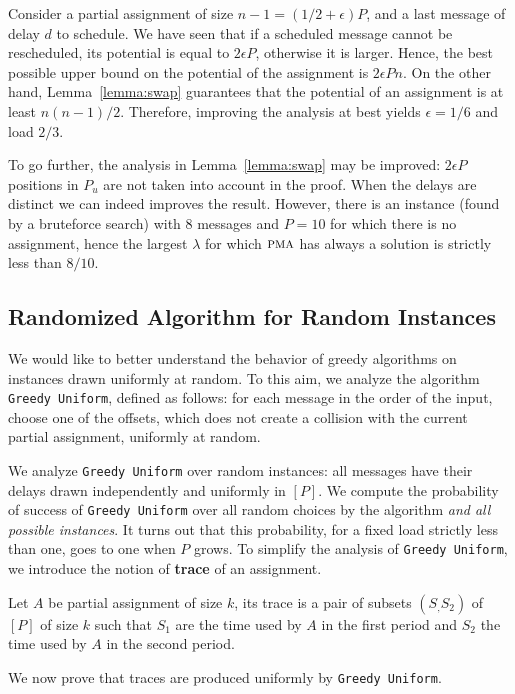 \documentclass[a4paper,UKenglish,cleveref, autoref, thm-restate]{lipics-v2019}
\newcommand\pma{\textsc{pma}\xspace}
\newcommand\greedyuniform{\texttt{Greedy Uniform}\xspace}
\begin{document}
Consider a partial assignment of size $n-1 = (1/2 + \epsilon)P$, and a last message of delay $d$ to schedule.
We have seen that if a scheduled message cannot be rescheduled, its potential is equal to $2\epsilon P$, otherwise it is larger.
Hence, the best possible upper bound on the potential of the assignment is $2\epsilon P n$. On the other hand, Lemma~\ref{lemma:swap} guarantees
that the potential of an assignment is at least $n(n-1)/2$. Therefore, improving the analysis at best yields $\epsilon = 1/6$ and 
load $2/3$.

To go further, the analysis in Lemma~\ref{lemma:swap} may be improved: $2\epsilon P$ positions in $P_{u}$ are not taken into account in the proof. When the delays are distinct we can indeed improves the result. However, there is an instance (found by a bruteforce search) with $8$ messages and $P=10$ for which there is no assignment, hence the largest $\lambda$ for which $\pma$ has always a solution is strictly less than $8/10$. 

\subsection{Randomized Algorithm for Random Instances}

We would like to better understand the behavior of greedy algorithms on instances drawn uniformly at random. To this aim, we analyze the algorithm \greedyuniform, defined as follows: for each message in the order of the input, choose one of the offsets, which does not create a collision with the current partial assignment, uniformly at random. 

We analyze \greedyuniform over random instances:  all messages have 
their delays drawn independently and uniformly in $[P]$. We compute the probability of success of \greedyuniform over all random choices by the algorithm \emph{and all possible instances}. 
It turns out that this probability, for a fixed load strictly less than one, goes to one when $P$ grows. To simplify the analysis of \greedyuniform, we introduce the notion of \textbf{trace} of an assignment. 

\begin{definition}
Let $A$ be partial assignment of size $k$, its trace is a pair of subsets $(S_,S_2)$ of $[P]$ of size $k$ such that $S_1$
are the time used by $A$ in the first period and $S_2$ the time used by $A$ in the second period.
\end{definition}

 We now prove that traces are produced uniformly by \greedyuniform.
\end{document}
